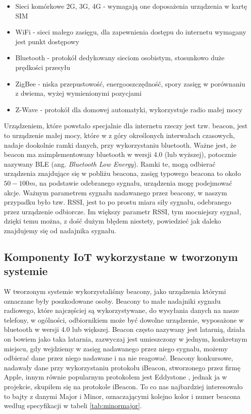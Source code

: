 \begin{itemize}
	\item{Sieci komórkowe 2G, 3G, 4G - wymagają one doposażenia urządzenia w kartę SIM}
	\item{WiFi - sieci małego zasięgu, dla zapewnienia dostępu do internetu wymagany jest punkt dostępowy}
	\item{Bluetooth - protokół dedykowany sieciom osobistym, stosunkowo duże prędkości przesyłu}
	\item{ZigBee - niska przepustowość, energooszczędność, spory zasięg w porównaniu z dwiema, wyżej wymienionymi pozycjami}
	\item{Z-Wave - protokół dla domowej automatyki, wykorzystuje radio małej mocy}
\end{itemize}

Urządzeniem, które powstało specjalnie dla internetu rzeczy jest tzw. beacon, jest to urządzenie małej mocy, które w z góry określonych interwałach czasowych, nadaje dookolnie ramki danych, przy wykorzystaniu bluetooth. Ważne jest, że beacon ma zaimplementowany bluetooth w wersji 4.0 (lub wyższej), potocznie nazywany BLE (ang. \textit{Bluetooth Low Energy}). Ramki te, mogą odbierać urządzenia znajdujące się w pobliżu beacona, zasięg typowego beacona to około $50-100 m$, na podstawie odebranego sygnału, urządzenia mogę podejmować akcje. Ważnym parametrem sygnału nadawanego przez beacony, w naszym przypadku było tzw. RSSI, jest to po prostu miara siły sygnału, odebranego przez urządzenie odbiorcze. Im większy parametr RSSI, tym mocniejszy sygnał, dzięki temu można, z dość dużym błędem niestety, powiedzieć jak daleko znajdujemy się od nadajnika sygnału.

\subsection{Komponenty IoT wykorzystane w tworzonym systemie}

W tworzonym systemie wykorzystaliśmy beacony, jako urządzenia którymi oznaczane były poszkodowane osoby. Beacony to małe nadajniki sygnału radiowego, które najczęściej są wykorzystywane, do wysyłania danych na nasze telefony, w ogólności, odbiornikiem może być dowolne urządzenie, wyposażone w bluetooth w wersji 4.0 lub większej. Beacon często nazywany jest latarnią, działa on bowiem jako taka latarnia, zazwyczaj jest umieszczony w jednym, konkretnym miejscu, gdy wejdziemy w zasięg nadawanego przez niego sygnału, możemy odbierać dane przez niego nadawane i na nie reagować. Beacony konkursowe, nadawały dane przy wykorzystaniu protokołu iBeacon\cite{ibeacon}, stworzonego przez firmę Apple, innym równie popularnym protokołem jest Eddystone \cite{eddystone}, jednak ja w projekcie, skupiłem się na protokole iBeacon. To co nas najbardziej interesowało to bajty z danymi Major i Minor, oznaczającymi kolejno kolor i numer beacona według specyfikacji w tabeli \ref{tab:minormajor}.

